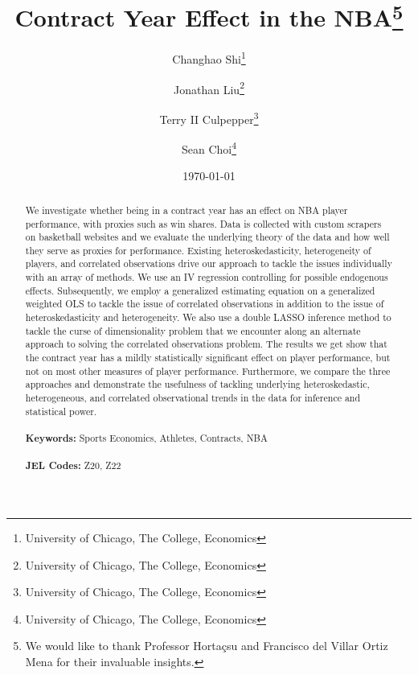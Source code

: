 \documentclass[12pt]{article}
\begin{document}
	
	\begin{titlepage}
		\title{Contract Year Effect in the NBA\thanks{We would like to thank Professor Hortaçsu and Francisco del Villar Ortiz Mena for their invaluable insights.}}
		\author{Changhao Shi\thanks{University of Chicago, The College, Economics} \and Jonathan Liu\thanks{University of Chicago, The College, Economics} \and Terry II Culpepper\thanks{University of Chicago, The College, Economics} \and Sean Choi\thanks{University of Chicago, The College, Economics}}
		\date{\today}
		\maketitle
		\begin{abstract}
			\noindent We investigate whether being in a contract year has an effect on NBA player performance, with proxies such as win shares. Data is collected with custom scrapers on basketball websites and we evaluate the underlying theory of the data and how well they serve as proxies for performance. Existing heteroskedasticity, heterogeneity of players, and correlated observations drive our approach to tackle the issues individually with an array of methods. We use an IV regression controlling for possible endogenous effects. Subsequently, we employ a generalized estimating equation on a generalized weighted OLS to tackle the issue of correlated observations in addition to the issue of heteroskedasticity and heterogeneity. We also use a double LASSO inference method to tackle the curse of dimensionality problem that we encounter along an alternate approach to solving the correlated observations problem. The results we get show that the contract year has a mildly statistically significant effect on player performance, but not on most other measures of player performance. Furthermore, we compare the three approaches and demonstrate the usefulness of tackling underlying heteroskedastic, heterogeneous, and correlated observational trends in the data for inference and statistical power. \\
			\vspace{0in}\\
			\noindent\textbf{Keywords:} Sports Economics, Athletes, Contracts, NBA\\
			\vspace{0in}\\
			\noindent\textbf{JEL Codes:} Z20, Z22 \\
			
			\bigskip
		\end{abstract}
		\setcounter{page}{0}
		\thispagestyle{empty}
	\end{titlepage}
	\pagebreak \newpage
\end{document}
